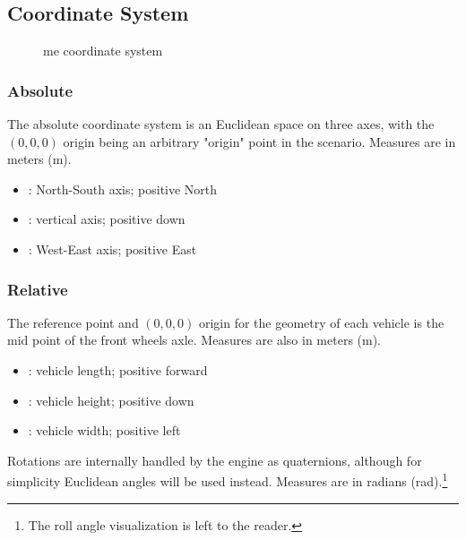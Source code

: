 \subsection{Coordinate System} %

\begin{figure}[!ht]
	\FLOATcenter{}

    \caption{\gls{me} coordinate system}\label{im:software:mecoords}
\end{figure}

\subsubsection{Absolute}

The absolute coordinate system is an Euclidean space on three axes, with the $(0,0,0)$ origin being an arbitrary "origin" point in the scenario. Measures are in meters (\si{\meter}).

\begin{itemize}
	\item {}: North-South axis; positive North
	\item {}: vertical axis; positive down
	\item {}: West-East axis; positive East
\end{itemize}

\subsubsection{Relative}

The reference point and $(0,0,0)$ origin for the geometry of each vehicle is the mid point of the front wheels axle. Measures are also in meters (\si{\meter}).

\begin{itemize}
	\item {}: vehicle length; positive forward
	\item {}: vehicle height; positive down
	\item {}: vehicle width; positive left
\end{itemize}

Rotations are internally handled by the engine as quaternions, although for simplicity Euclidean angles will be used instead. Measures are in radians (\si{\radian}).\footnote{The roll angle visualization is left to the reader.}

